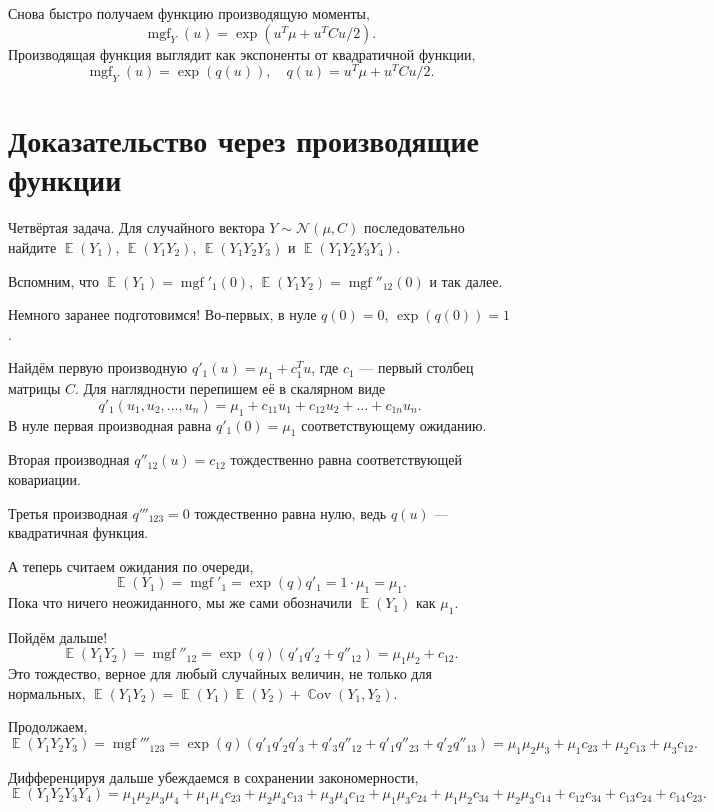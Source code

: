 \documentclass[12pt]{article}
\DeclareMathOperator{\Cov}{\mathbb{C}ov}
\DeclareMathOperator{\E}{\mathbb{E}}
\DeclareMathOperator{\mgf}{mgf}
\newcommand{\cN}{\mathcal{N}}
\begin{document}
Снова быстро получаем функцию производящую моменты, 
\[
\mgf_Y(u) = \exp(u^T\mu + u^T C u/2).
\]
Производящая функция выглядит как экспоненты от квадратичной функции,
\[
\mgf_Y(u) = \exp(q(u)), \quad q(u) = u^T\mu + u^T C u/2.
\]

\section*{Доказательство через производящие функции}
Четвёртая задача. 
Для случайного вектора $Y \sim \cN(\mu, C)$ последовательно найдите $\E(Y_1)$, $\E(Y_1 Y_2)$, $\E(Y_1 Y_2 Y_3)$ и $\E(Y_1 Y_2 Y_3 Y_4)$.

Вспомним, что $\E(Y_1) = \mgf'_1(0)$, $\E(Y_1 Y_2) = \mgf''_{12}(0)$ и так далее. 

Немного заранее подготовимся! Во-первых, в нуле $q(0) = 0$, $\exp(q(0)) = 1$.

Найдём первую производную $q'_1(u) = \mu_1 + c_1^T u$, где $c_1$ — первый столбец матрицы $C$.
Для наглядности перепишем её в скалярном виде
\[
    q'_1(u_1, u_2, \dots, u_n) = \mu_1 + c_{11}u_1 + c_{12}u_2 + \dots + c_{1n}u_n.
\]
В нуле первая производная равна $q'_1(0) = \mu_1$ соответствующему ожиданию. 

Вторая производная $q''_{12}(u) = c_{12}$ тождественно равна соответствующей ковариации. 

Третья производная $q'''_{123} = 0$  тождественно равна нулю, ведь $q(u)$ — квадратичная функция.

А теперь считаем ожидания по очереди,
\[
    \E(Y_1) = \mgf'_1 = \exp(q) q'_1 = 1 \cdot \mu_1 = \mu_1.
\]
Пока что ничего неожиданного, мы же сами обозначили $\E(Y_1)$ как $\mu_1$.

Пойдём дальше!
\[
    \E(Y_1Y_2) = \mgf''_{12} = \exp(q) (q'_1q'_2 + q''_{12}) = \mu_1 \mu_2 + c_{12}.
\]
Это тождество, верное для любый случайных величин, не только для нормальных, $\E(Y_1 Y_2) = \E(Y_1) \E(Y_2) + \Cov(Y_1, Y_2)$.

Продолжаем,
\[
    \E(Y_1 Y_2 Y_3) = \mgf'''_{123} = \exp(q) (q'_1 q'_2 q'_3 + q'_3 q''_{12} + q'_1 q''_{23} + q'_2 q''_{13}) = \mu_1 \mu_2\mu_3 + \mu_1 c_{23} + \mu_2 c_{13} + \mu_3 c_{12}.
\]

Дифференцируя дальше убеждаемся в сохранении закономерности, 
\[
    \E(Y_1 Y_2 Y_3 Y_4) = \mu_1 \mu_2\mu_3 \mu_4 + \mu_1 \mu_4 c_{23} + \mu_2 \mu_4 c_{13} + \mu_3 \mu_4 c_{12} + \mu_1 \mu_3 c_{24} + \mu_1 \mu_2 c_{34} + \mu_2 \mu_3 c_{14} +  c_{12}c_{34} + c_{13}c_{24} + c_{14}c_{23}.
\]
\end{document}
